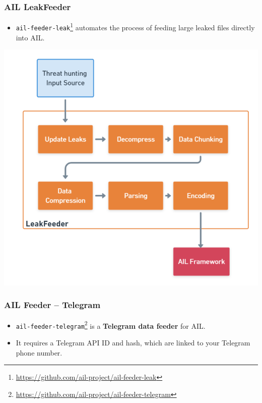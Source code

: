 \documentclass[10pt,aspectratio=169, colorlinks=true, linkcolor=circlBlue]{beamer}
\begin{document}
\begin{frame}[fragile]
    \frametitle{AIL LeakFeeder}

    \begin{itemize}
        \item \texttt{ail-feeder-leak}\footnote{\url{https://github.com/ail-project/ail-feeder-leak}} automates the process of feeding large leaked files directly into AIL.
    \end{itemize}
    
    \centerline{\includegraphics[scale=0.20]{./images/feeder_leak.png}}
\end{frame}


\begin{frame}[fragile]
    \frametitle{AIL Feeder – Telegram}

    \begin{itemize}
        \item \texttt{ail-feeder-telegram}\footnote{\url{https://github.com/ail-project/ail-feeder-telegram}} is a {\bf Telegram data feeder} for AIL.
        
        \item It requires a Telegram API ID and hash, which are linked to your Telegram phone number.
    \end{itemize}
\end{frame}
\end{document}
